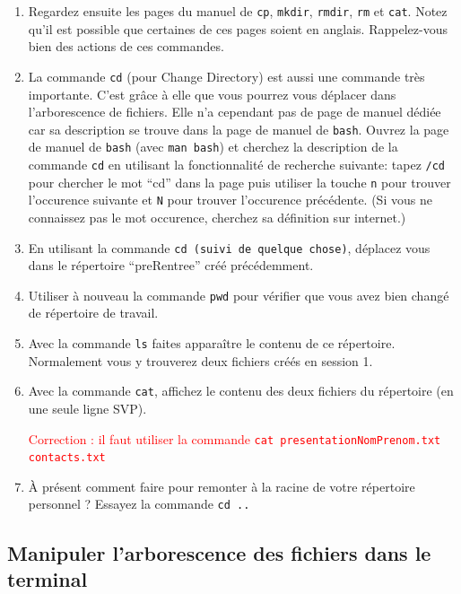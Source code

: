 \documentclass{article}
\begin{document}
\begin{exercice}

\begin{enumerate}
\def\labelenumi{\arabic{enumi}.}
\item
  Regardez ensuite les pages du manuel de \texttt{cp}, \texttt{mkdir},
  \texttt{rmdir}, \texttt{rm} et \texttt{cat}.
  Notez qu'il est possible que certaines de ces pages soient en anglais. Rappelez-vous bien des actions de ces commandes.
\item
  La commande \texttt{cd} (pour Change Directory) est aussi une commande très importante. C'est grâce à elle que vous pourrez vous déplacer dans l'arborescence de fichiers. 
  Elle n'a cependant pas de page de manuel dédiée car sa description se trouve dans la page de manuel de \texttt{bash}. 
  Ouvrez la page de manuel de \texttt{bash} (avec \texttt{man bash}) et cherchez la description de la commande \texttt{cd} en
  utilisant la fonctionnalité de recherche suivante: tapez \texttt{/cd}
  pour chercher le mot ``cd'' dans la page puis utiliser la touche
  \texttt{n} pour trouver l'occurence suivante et \texttt{N} pour
  trouver l'occurence précédente. (Si vous ne connaissez pas le mot occurence, cherchez sa définition sur internet.)
\item
 En utilisant la commande \texttt{cd (suivi de quelque chose)}, déplacez vous dans le répertoire ``preRentree'' créé précédemment.
\item
 Utiliser à nouveau la commande \texttt{pwd} pour vérifier que vous avez bien changé de répertoire de travail.
\item
 Avec la commande \texttt{ls} faites apparaître le contenu de ce répertoire. Normalement vous y trouverez deux fichiers créés en session 1.
\item
Avec la commande \texttt{cat}, affichez le contenu des deux fichiers du répertoire (en une seule ligne SVP).

\textcolor{red}{Correction : il faut utiliser la commande \texttt{cat presentationNomPrenom.txt contacts.txt}}

\item
À présent comment faire pour remonter à la racine de votre répertoire personnel ? Essayez la commande \texttt{cd ..}
\end{enumerate}

\end{exercice}

\hypertarget{manipuler-larborescence-des-fichiers-dans-le-terminal}{%
\subsection{Manipuler l'arborescence des fichiers dans le
terminal}\label{manipuler-larborescence-des-fichiers-dans-le-terminal}}
\end{document}
